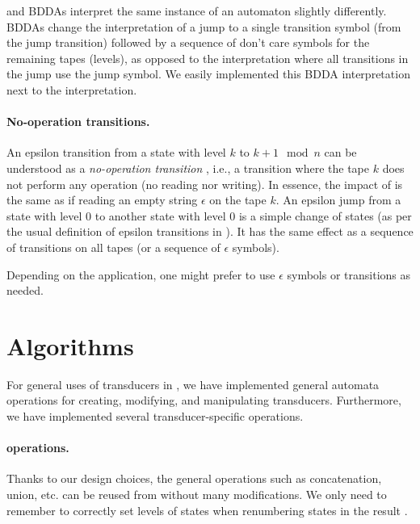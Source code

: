 \nfts and BDDAs interpret the same instance of an \nft automaton slightly differently.
BDDAs change the interpretation of a jump to a single transition symbol (from the jump transition) followed by a sequence of don't care symbols for the remaining tapes (levels), as opposed to the \nft interpretation where all transitions in the jump use the jump symbol.
We easily implemented this BDDA interpretation next to the \nft interpretation.

\paragraph{No-operation transitions.}
An epsilon transition from a state with level $k$ to $k+1 \mod n$ can be understood as a \emph{no-operation transition} \nop, i.e., a transition where the tape $k$ does not perform any operation (no reading nor writing). In essence, the impact of \nop is the same as if reading an empty string $\epsilon$ on the tape $k$.
An epsilon jump from a state with level $0$ to another state with level $0$ is a simple change of states (as per the usual definition of epsilon transitions in \nfas).
It has the same effect as a sequence of \nop transitions on all tapes (or a sequence of $\epsilon$ symbols).

Depending on the application, one might prefer to use $\epsilon$ symbols or \nop transitions as needed.

\section{Algorithms}
\label{sec:Algorithms}

For general uses of transducers in \mata, we have implemented general automata operations for creating, modifying, and manipulating transducers.
Furthermore, we have implemented several transducer-specific operations.

\paragraph{\nfa operations.}
Thanks to our design choices, the general \nfa operations such as concatenation, union, etc. can be reused from \nfa without many modifications.
We only need to remember to correctly set levels of states when renumbering states in the result \nft.

